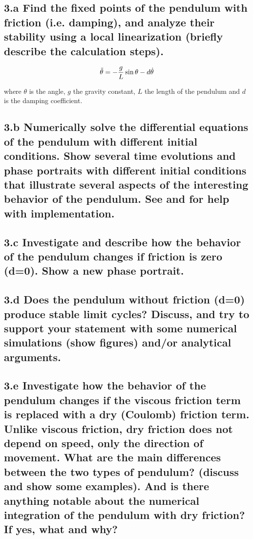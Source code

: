 \documentclass{cmc}
\begin{document}
\subsection*{3.a Find the fixed points of the pendulum with friction
  (i.e. damping), and analyze their stability using a local linearization
  (briefly describe the calculation steps). }


\begin{equation}
  \label{eq:ode-pendulum}
  \ddot{\theta} = - {g \over L} \sin \theta - d \dot{\theta}
\end{equation}

where $\theta$ is the angle, $g$ the gravity constant, $L$ the length of the pendulum
and $d$ is the damping coefficient.


\subsection*{3.b Numerically solve the differential equations of the pendulum
  with different initial conditions.  Show several time evolutions and phase
  portraits with different initial conditions that illustrate several aspects of
  the interesting behavior of the pendulum. See  and
   for help with implementation.}


\subsection*{3.c Investigate and describe how the behavior of the pendulum
  changes if friction is zero (d=0).  Show a new phase portrait.}


\subsection*{3.d Does the pendulum without friction (d=0) produce stable limit
  cycles? Discuss, and try to support your statement with some numerical
  simulations (show figures) and/or analytical arguments.}


\subsection*{3.e Investigate how the behavior of the pendulum changes if the
  viscous friction term is replaced with a dry (Coulomb) friction term. Unlike
  viscous friction, dry friction does not depend on speed, only the direction of
  movement. What are the main differences between the two types of pendulum?
  (discuss and show some examples). And is there anything notable about the
  numerical integration of the pendulum with dry friction? If yes, what and why?}
\end{document}
